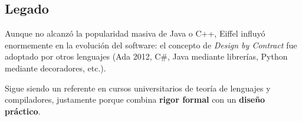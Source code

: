 \documentclass[a4paper,12pt]{article}
\begin{document}
\subsection{Legado}

Aunque no alcanzó la popularidad masiva de Java o C++, Eiffel influyó
enormemente en la evolución del software: el concepto de \textit{Design by
    Contract} fue adoptado por otros lenguajes (Ada 2012, C\#, Java mediante
librerías, Python mediante decoradores, etc.).

\noindent
Sigue siendo un referente en cursos universitarios de teoría de lenguajes y
compiladores, justamente porque combina \textbf{rigor formal} con un
\textbf{diseño práctico}.
\end{document}

